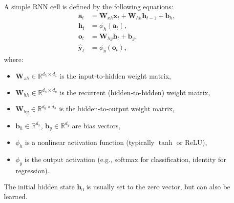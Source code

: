 \documentclass{tufte-handout}
\begin{document}
\begin{defn}
    A simple RNN cell is defined by the following equations:
    \begin{align}
        \mathbf{a}_t &= \mathbf{W}_{xh} \mathbf{x}_t + \mathbf{W}_{hh} \mathbf{h}_{t-1} + \mathbf{b}_h, \label{eq:rnn_pre} \\
        \mathbf{h}_t &= \phi_h(\mathbf{a}_t), \label{eq:rnn_hidden} \\
        \mathbf{o}_t &= \mathbf{W}_{hy} \mathbf{h}_t + \mathbf{b}_y, \label{eq:rnn_output} \\
        \hat{\mathbf{y}}_t &= \phi_y(\mathbf{o}_t), \label{eq:rnn_pred}
    \end{align}
    where:
    \begin{itemize}
        \item $\mathbf{W}_{xh} \in \mathbb{R}^{d_h \times d_x}$ is the input‑to‑hidden weight matrix,
        \item $\mathbf{W}_{hh} \in \mathbb{R}^{d_h \times d_h}$ is the recurrent (hidden‑to‑hidden) weight matrix,
        \item $\mathbf{W}_{hy} \in \mathbb{R}^{d_y \times d_h}$ is the hidden‑to‑output weight matrix,
        \item $\mathbf{b}_h \in \mathbb{R}^{d_h}$, $\mathbf{b}_y \in \mathbb{R}^{d_y}$ are bias vectors,
        \item $\phi_h$ is a nonlinear activation function (typically $\tanh$ or ReLU),
        \item $\phi_y$ is the output activation (e.g., softmax for classification, identity for regression).
    \end{itemize}
    The initial hidden state $\mathbf{h}_0$ is usually set to the zero vector, but can also be learned.
\end{defn}

\begin{marginfigure}
\centering
{}
\caption{Schematic of a single RNN cell. The hidden state $\mathbf{h}_t$ is fed back to the next time step.}
\end{marginfigure}
\end{document}
